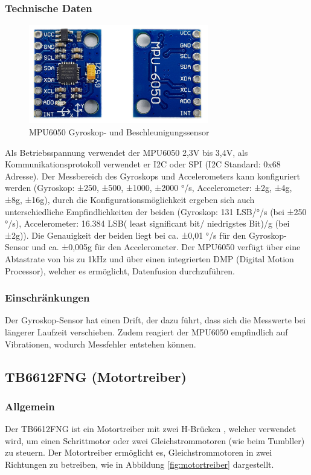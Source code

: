 \subsubsection{Technische Daten}
\begin{figure}[H]
    \centering
    \includegraphics[width=0.7\textwidth]{img/Hardware/MPU6050.png}
    \caption{MPU6050 Gyroskop- und Beschleunigungssensor}
    \label{fig:mpu6050}
\end{figure}
Als Betriebsspannung verwendet der MPU6050 2,3V bis 3,4V,
als Kommunikationsprotokoll verwendet er I2C oder SPI (I2C Standard: 0x68 Adresse).
%
Der Messbereich des Gyroskops und Accelerometers kann konfiguriert werden
(Gyroskop:  ±250, ±500, ±1000, ±2000 °/s, Accelerometer: ±2g, ±4g, ±8g, ±16g),
durch die Konfigurationsmöglichkeit ergeben sich auch unterschiedliche Empfindlichkeiten der beiden
(Gyroskop: 131 LSB/°/s (bei ±250 °/s),
Accelerometer: 16.384 LSB( least significant bit/ niedrigstes Bit)/g (bei ±2g)).
%
Die Genauigkeit der beiden liegt bei ca. ±0,01 °/s für den Gyroskop-Sensor und ca. ±0,005g für den Accelerometer.
%
Der MPU6050 verfügt über eine Abtastrate von bis zu 1kHz und über einen integrierten DMP (Digital Motion Processor),
welcher es ermöglicht, Datenfusion durchzuführen.
%
\subsubsection{Einschränkungen}
Der Gyroskop-Sensor hat einen Drift,
der dazu führt, dass sich die Messwerte bei längerer Laufzeit verschieben.
%
Zudem reagiert der MPU6050 empfindlich auf Vibrationen,
wodurch Messfehler entstehen können.
%
\subsection{TB6612FNG (Motortreiber)}
%
\subsubsection{Allgemein}
Der TB6612FNG ist ein Motortreiber mit zwei H-Brücken \cite{toshiba-tb6612fng},
welcher verwendet wird,
um einen Schrittmotor oder zwei Gleichstrommotoren (wie beim Tumbller) zu steuern.
%
Der Motortreiber ermöglicht es,
Gleichstrommotoren in zwei Richtungen zu betreiben,
wie in Abbildung \ref{fig:motortreiber} dargestellt.
%
